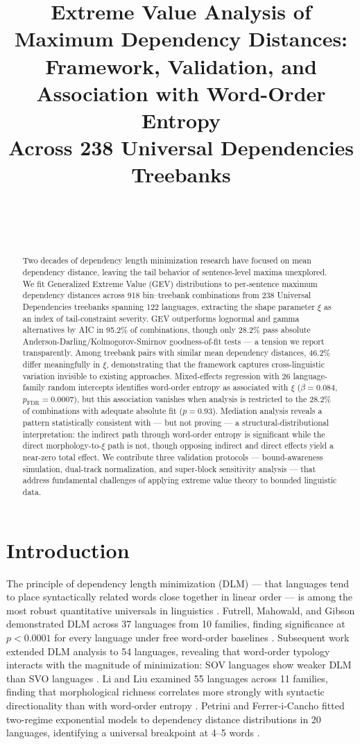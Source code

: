 \documentclass[11pt,letterpaper]{article}
\title{Extreme Value Analysis of Maximum Dependency Distances:\\Framework, Validation, and Association with Word-Order Entropy\\Across 238 Universal Dependencies Treebanks}
\author{~}
\date{~}
\begin{document}
\maketitle

\begin{abstract}
Two decades of dependency length minimization research have focused on mean dependency distance, leaving the tail behavior of sentence-level maxima unexplored. We fit Generalized Extreme Value (GEV) distributions to per-sentence maximum dependency distances across 918 bin--treebank combinations from 238 Universal Dependencies treebanks spanning 122 languages, extracting the shape parameter $\xi$ as an index of tail-constraint severity. GEV outperforms lognormal and gamma alternatives by AIC in 95.2\% of combinations, though only 28.2\% pass absolute Anderson-Darling/Kolmogorov-Smirnov goodness-of-fit tests --- a tension we report transparently. Among treebank pairs with similar mean dependency distances, 46.2\% differ meaningfully in $\xi$, demonstrating that the framework captures cross-linguistic variation invisible to existing approaches. Mixed-effects regression with 26 language-family random intercepts identifies word-order entropy as associated with $\xi$ ($\beta = 0.084$, $p_{\text{FDR}} = 0.0007$), but this association vanishes when analysis is restricted to the 28.2\% of combinations with adequate absolute fit ($p = 0.93$). Mediation analysis reveals a pattern statistically consistent with --- but not proving --- a structural-distributional interpretation: the indirect path through word-order entropy is significant while the direct morphology-to-$\xi$ path is not, though opposing indirect and direct effects yield a near-zero total effect. We contribute three validation protocols --- bound-awareness simulation, dual-track normalization, and super-block sensitivity analysis --- that address fundamental challenges of applying extreme value theory to bounded linguistic data.
\end{abstract}

\section{Introduction}

The principle of dependency length minimization (DLM) --- that languages tend to place syntactically related words close together in linear order --- is among the most robust quantitative universals in linguistics \cite{Futrell2015, Liu2017}. Futrell, Mahowald, and Gibson demonstrated DLM across 37 languages from 10 families, finding significance at $p < 0.0001$ for every language under free word-order baselines \cite{Futrell2015}. Subsequent work extended DLM analysis to 54 languages, revealing that word-order typology interacts with the magnitude of minimization: SOV languages show weaker DLM than SVO languages \cite{Yadav2020, Yadav2022}. Li and Liu examined 55 languages across 11 families, finding that morphological richness correlates more strongly with syntactic directionality than with word-order entropy \cite{Li2025}. Petrini and Ferrer-i-Cancho fitted two-regime exponential models to dependency distance distributions in 20 languages, identifying a universal breakpoint at 4--5 words \cite{Petrini2025}.
\end{document}
